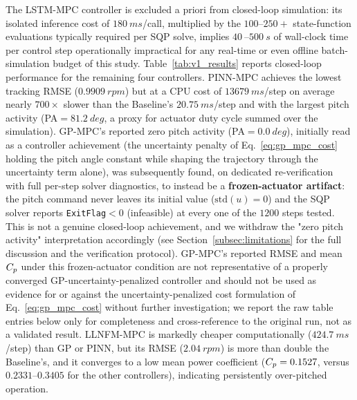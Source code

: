 The LSTM-MPC controller is excluded a priori from closed-loop simulation:
its isolated inference cost of $\SI{180}{ms}$/call, multiplied by the
$100$--$250{+}$ state-function evaluations typically required per SQP
solve, implies $\SI{40}{}$--$\SI{500}{s}$ of wall-clock time per control
step operationally impractical for any real-time or even offline
batch-simulation budget of this study. Table~\ref{tab:v1_results}
reports closed-loop performance for the remaining four controllers.
PINN-MPC achieves the lowest tracking RMSE ($\SI{0.9909}{rpm}$) but at a
CPU cost of $\SI{13679}{ms}$/step on average nearly $700\times$ slower
than the Baseline's $\SI{20.75}{ms}$/step and with the largest pitch
activity (PA$=\SI{81.2}{deg}$, a proxy for actuator duty cycle summed over
the simulation). GP-MPC's reported zero pitch activity
(PA$=\SI{0.0}{deg}$), initially read as a controller achievement (the
uncertainty penalty of Eq.~\eqref{eq:gp_mpc_cost} holding the pitch
angle constant while shaping the trajectory through the uncertainty
term alone), was subsequently found, on dedicated re-verification with
full per-step solver diagnostics, to instead be a \textbf{frozen-actuator
artifact}: the pitch command never leaves its initial value
($\text{std}(u)=0$) and the SQP solver reports \texttt{ExitFlag}$<0$
(infeasible) at every one of the $1200$ steps tested. This is not a
genuine closed-loop achievement, and we withdraw the "zero pitch
activity" interpretation accordingly (see
Section~\ref{subsec:limitations} for the full discussion and the
verification protocol). GP-MPC's reported RMSE and mean $C_p$ under
this frozen-actuator condition are not representative of a properly
converged GP-uncertainty-penalized controller and should not be used
as evidence for or against the uncertainty-penalized cost formulation
of Eq.~\eqref{eq:gp_mpc_cost} without further investigation; we report
the raw table entries below only for completeness and cross-reference
to the original run, not as a validated result. LLNFM-MPC is
markedly cheaper computationally ($\SI{424.7}{ms}$/step) than GP or PINN,
but its RMSE ($\SI{2.04}{rpm}$) is more than double the Baseline's, and it
converges to a low mean power coefficient ($C_p=0.1527$, versus
$0.2331$--$0.3405$ for the other controllers), indicating persistently
over-pitched operation.

